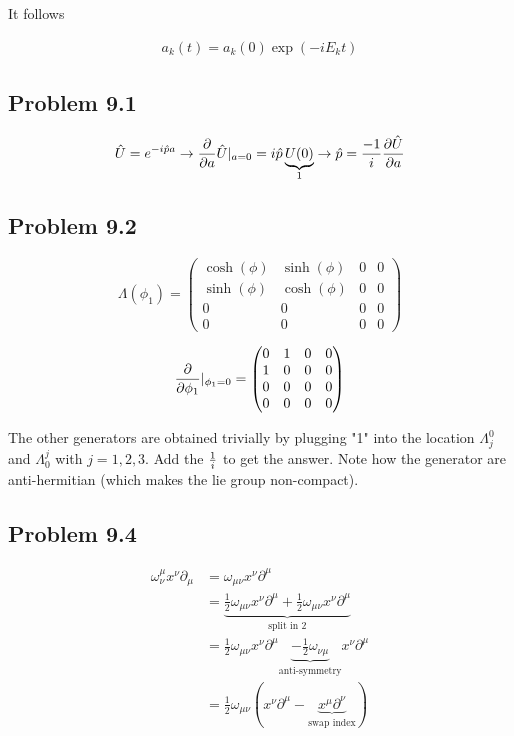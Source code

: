 \documentclass[11pt]{article}
\theoremstyle{definition}
\begin{document}
It follows

\begin{align}
a_k(t) = a_k(0) \exp(-i E_k t)
\end{align}

\subsection{Problem 9.1}

\begin{align}
\hat{U} = e^{-i \hat{p}a} \rightarrow {\partial \over \partial a} \hat{U}|_{a= 0} = {i \hat{p}} \underbrace{U(0)}_{1} \rightarrow \hat{p } = {-1 \over i} {\partial \hat{U} \over \partial a}
\end{align}

\subsection{Problem 9.2}

\begin{equation*}
\Lambda(\phi_1) = 
\begin{pmatrix}
\cosh(\phi) & \sinh(\phi) & 0 & 0 \\
\sinh(\phi) & \cosh(\phi) & 0  & 0\\
0 & 0 & 0  & 0 \\
0 & 0 & 0 & 0
\end{pmatrix}
\end{equation*}

\begin{align}
{\partial \over \partial \phi_1}|_{\phi_1 = 0} = 
\begin{pmatrix}
0 & 1& 0 & 0 \\
1 & 0 & 0  & 0\\
0 & 0 & 0  & 0 \\
0 & 0 & 0 & 0
\end{pmatrix}
\end{align}

The other generators are obtained trivially by plugging "1" into the location $\Lambda^{0}_{j}$ and $\Lambda^{j}_{0}$ with $j = 1,2,3$.   Add the ${1 \over i}$ to get the answer.  Note how the generator are anti-hermitian (which makes the lie group non-compact).

\subsection{Problem 9.4}

\begin{align}
\omega^{\mu}_\nu x^\nu \partial_\mu & = \omega_{\mu \nu} x^\nu \partial^\mu \\
& = \underbrace{\frac12 \omega_{\mu \nu} x^\nu \partial^\mu + \frac12 \omega_{\mu \nu} x^\nu \partial^\mu}_{\text{split in 2}} \\
& = \frac12 \omega_{\mu \nu} x^\nu \partial^\mu \underbrace{- \frac12 \omega_{\nu \mu}}_{\text{anti-symmetry}} x^\nu \partial^\mu \\
& = \frac12 \omega_{\mu \nu} \left(x^\nu \partial^\mu - \underbrace{x^\mu \partial^\nu}_{\text{swap index}} \right)
\end{align}
\end{document}
